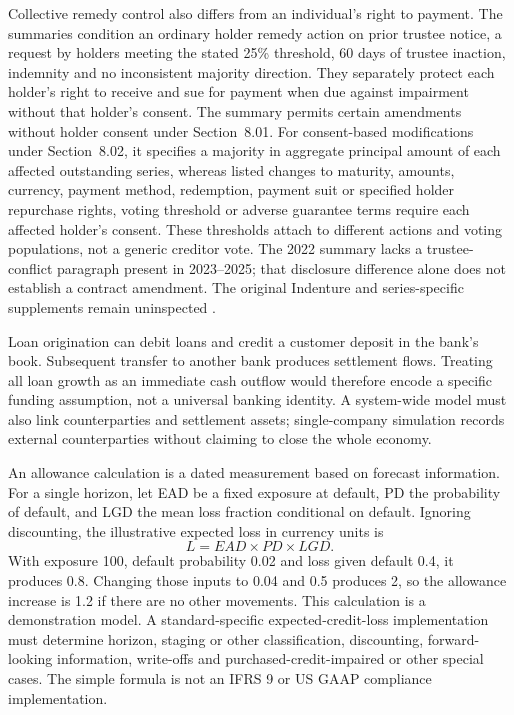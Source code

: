 Collective remedy control also differs from an individual's right to payment.
The summaries condition an ordinary holder remedy action on prior trustee
notice, a request by holders meeting the stated 25\% threshold, 60 days of
trustee inaction, indemnity and no inconsistent majority direction. They
separately protect each holder's right to receive and sue for payment when due
against impairment without that holder's consent. The summary permits certain
amendments without holder consent under Section~8.01. For consent-based
modifications under Section~8.02, it specifies a majority in aggregate
principal amount of each affected outstanding series, whereas
listed changes to maturity, amounts, currency, payment method, redemption,
payment suit or specified holder repurchase rights, voting threshold or adverse guarantee terms require each
affected holder's consent. These thresholds attach to different actions and
voting populations, not a generic creditor vote. The 2022 summary lacks a
trustee-conflict paragraph present in 2023--2025; that disclosure difference
alone does not establish a contract amendment. The original Indenture and
series-specific supplements remain uninspected
\citep{jpmorgan2022tenk,jpmorgan2023tenk,jpmorgan2024tenk,jpmorgan2025tenk}.

Loan origination can debit loans and credit a customer deposit in the bank's
book. Subsequent transfer to another bank produces settlement flows. Treating
all loan growth as an immediate cash outflow would therefore encode a specific
funding assumption, not a universal banking identity. A system-wide model must
also link counterparties and settlement assets; single-company simulation
records external counterparties without claiming to close the whole economy.

\newpage
An allowance calculation is a dated measurement based on forecast information.
For a single horizon, let EAD be a fixed exposure at default, PD the probability
of default, and LGD the mean loss fraction conditional on default. Ignoring
discounting, the illustrative expected loss in currency units is
\[
 L=EAD\times PD\times LGD.
\]
With exposure 100, default probability 0.02 and loss given default 0.4, it
produces 0.8. Changing those inputs to 0.04 and 0.5 produces 2, so the allowance
increase is 1.2 if there are no other movements. This calculation is a
demonstration model. A standard-specific expected-credit-loss implementation
must determine horizon, staging or other classification, discounting,
forward-looking information, write-offs and purchased-credit-impaired or
other special cases. The simple formula is not an IFRS 9 or US GAAP compliance
implementation.

